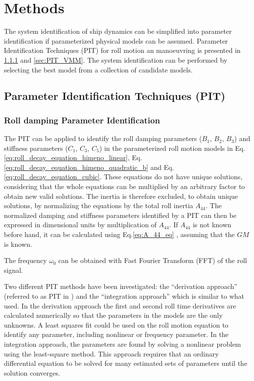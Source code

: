 \chapter{Methods\label{ch:methods}}
The system identification of ship dynamics can be simplified into parameter identification if parameterized physical models can be assumed. Parameter Identification Techniques (PIT) for roll motion an manoeuvring is presented in \ref{sec:PIT_roll} and \ref{sec:PIT_VMM}. The system identification can be performed by selecting the best model from a collection of candidate models.

\section{Parameter Identification Techniques (PIT)}

\subsection{Roll damping Parameter Identification} \label{sec:PIT_roll}
\noindent The PIT can be applied to identify the roll damping parameters ($B_1$, $B_2$, $B_3$) and stiffness parameters ($C_1$, $C_3$, $C_5$) in the parameterized roll motion models in Eq.\ref{eq:roll_decay_equation_himeno_linear}, Eq.\ref{eq:roll_decay_equation_himeno_quadratic_b} and Eq.\ref{eq:roll_decay_equation_cubic}. These equations do not have unique solutions, considering that the whole equations can be multiplied by an arbitrary factor to obtain new valid solutions. The inertia is therefore excluded, to obtain unique solutions, by normalizing the equations by the total roll inertia $A_{44}$.
The normalized damping and stiffness parameters identified by a PIT can then be expressed in dimensional units by multiplication of $A_{44}$. If $A_{44}$ is not known before hand, it can be calculated using Eq.\ref{eq:A_44_eq} \cite{piehl_ship_2016}, assuming that the $GM$ is known.

\noindent The frequency $\omega_0$ can be obtained with Fast Fourier Transform (FFT) of the roll signal. 

Two different PIT methods have been investigated: the ``derivation approach'' (referred to as PIT in \parencite{imo_1200_2006}) and the ``integration approach'' which is similar to what \parencite{soder_assessment_2019} used. In the derivation approach the first and second roll time derivatives are calculated numerically so that the parameters in the models are the only unknowns. A least squares fit could be used on the roll motion equation to identify any parameter, including nonlinear or frequency parameter. In the integration approach, the parameters are found by solving a nonlinear problem using the least-square method. This approach requires that an ordinary differential equation to be solved for many estimated sets of parameters until the solution converges.

